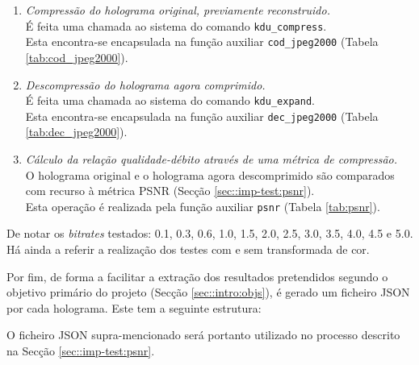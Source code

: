 \begin{enumerate}
    \item \textit{Compressão do holograma original, previamente reconstruido.} \\
        É feita uma chamada ao sistema do comando \verb|kdu_compress|.\\ Esta encontra-se encapsulada na função auxiliar \verb|cod_jpeg2000| (Tabela \ref{tab:cod_jpeg2000}).
    \item \textit{Descompressão do holograma agora comprimido.} \\
        É feita uma chamada ao sistema do comando \verb|kdu_expand|.\\ Esta encontra-se encapsulada na função auxiliar \verb|dec_jpeg2000| (Tabela \ref{tab:dec_jpeg2000}).
    \item \textit{Cálculo da relação qualidade-débito através de uma métrica de compressão.} \\
        O holograma original e o holograma agora descomprimido são comparados com recurso à métrica \ac{PSNR} (Secção \ref{sec::imp-test:psnr}).\\ Esta operação é realizada pela função auxiliar \verb|psnr| (Tabela \ref{tab:psnr}).
\end{enumerate}

De notar os \textit{bitrates} testados: \SI{0.1}{}, \SI{0.3}{}, \SI{0.6}{}, \SI{1.0}{}, \SI{1.5}{}, \SI{2.0}{}, \SI{2.5}{}, \SI{3.0}{}, \SI{3.5}{}, \SI{4.0}{}, \SI{4.5}{} e \SI{5.0}{}. Há ainda a referir a realização dos testes com e sem transformada de cor.

Por fim, de forma a facilitar a extração dos resultados pretendidos segundo o objetivo primário do projeto (Secção \ref{sec::intro:objs}), é gerado um ficheiro \ac{JSON} por cada holograma. Este tem a seguinte estrutura:

\begin{figure}[!h]
\end{figure}

O ficheiro \ac{JSON} supra-mencionado será portanto utilizado no processo descrito na Secção \ref{sec::imp-test:psnr}.


